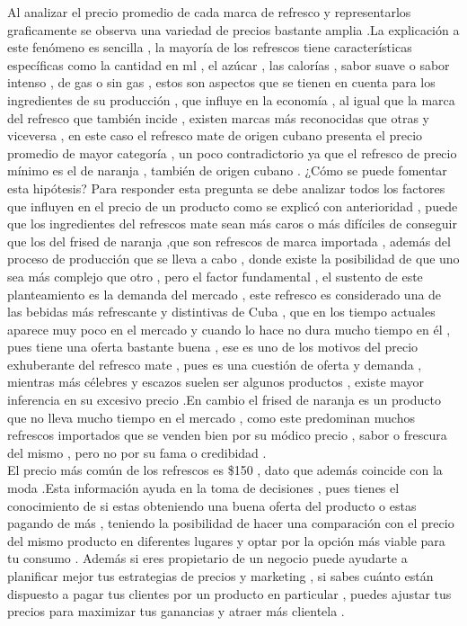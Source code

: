 \documentclass[twocolumn,12pt]{article}
\begin{document}
Al analizar el precio promedio de cada marca de refresco y representarlos graficamente se observa una variedad de precios bastante amplia .La explicación a este fenómeno es sencilla , la mayoría de los refrescos tiene características específicas como la cantidad en ml , el azúcar , las calorías , sabor suave o sabor intenso , de gas o sin gas , estos son aspectos que se tienen en cuenta para los ingredientes de su producción , que influye en la economía , al igual que la marca del refresco que también incide , existen marcas más reconocidas que otras y viceversa , en este caso el refresco mate de origen cubano presenta el precio promedio de mayor categoría , un poco contradictorio ya que el refresco de precio mínimo es el de naranja , también de origen cubano .
¿Cómo se puede fomentar esta hipótesis?
Para responder esta pregunta se debe analizar todos los factores que influyen en el precio de un producto como se explicó con anterioridad , puede que los ingredientes del refrescos mate sean más caros o más difíciles de conseguir que los del frised de naranja ,que son refrescos de marca importada , además del proceso de producción que se lleva a cabo , donde existe la posibilidad de que uno sea más complejo que otro , pero el factor fundamental , el sustento de este planteamiento es la demanda del mercado , este refresco es considerado  una de las bebidas más refrescante y distintivas de Cuba , que en los tiempo actuales aparece muy poco en el mercado y cuando lo hace no dura mucho tiempo en él , pues tiene una oferta bastante buena , ese es uno de los motivos del precio exhuberante del refresco mate , pues es una cuestión de oferta y demanda , mientras más célebres y escazos suelen ser algunos productos , existe mayor inferencia en su excesivo precio .En cambio el frised de naranja es un producto que no lleva mucho tiempo en el mercado , como este predominan muchos refrescos importados que se venden bien por su módico precio , sabor o frescura del mismo , pero no por su fama o credibidad .\\

El precio más común de los refrescos es \$150 , dato que además  coincide con la moda .Esta información ayuda en la toma de decisiones , pues tienes el conocimiento de si estas obteniendo una buena oferta del producto o estas pagando de más , teniendo la posibilidad de hacer una comparación con el precio del mismo producto en diferentes lugares y optar por la opción más viable para tu consumo . Además si eres propietario de un negocio  puede ayudarte a planificar mejor tus estrategias de precios y marketing , si sabes cuánto están dispuesto a pagar tus clientes por un producto en particular , puedes ajustar tus precios para maximizar tus ganancias y atraer más clientela .\\
\end{document}
